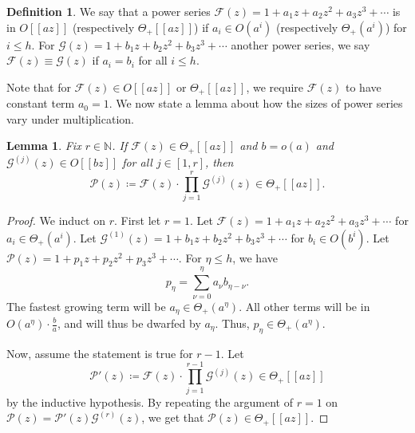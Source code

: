 \documentclass{daj}
\newtheorem{lemma}[theorem]{Lemma}
\theoremstyle{definition}
\newtheorem{definition}[theorem]{Definition}
\theoremstyle{remark}
\numberwithin{equation}{section}
\numberwithin{theorem}{section}
\newcommand{\N}{\mathbb{N}}
\newcommand{\calf}{\mathcal{F}}
\newcommand{\calg}{\mathcal{G}}
\newcommand{\calp}{\mathcal{P}}
\begin{document}
\begin{definition}
    We say that a power series $\calf(z) = 1 + a_1z+a_2z^{2} + a_3z^3 + \cdots$ is in $O[[az]]$ (respectively $\Theta_+[[az]]$) if $a_i \in O(a^i)$ (respectively $\Theta_+(a^i)$) for $i \leq h$. For $\calg(z)= 1 + b_1z+b_2z^{2} + b_3z^3 + \cdots$ another power series, we say $\calf(z) \equiv \calg(z)$ if $a_i = b_i$ for all $i \leq h$.
\end{definition}

Note that for $\calf(z) \in O[[az]]$ or $\Theta_+[[az]]$, we require $\calf(z)$ to have constant term $a_0 = 1$. We now state a lemma about how the sizes of power series vary under multiplication.

\begin{lemma}\label{lemmaProductsofGenFuncs}
    Fix $r \in \N$. If $\calf(z) \in \Theta_+[[az]]$ and $b = o(a)$ and $\calg^{(j)}(z) \in O[[bz]]$ for all $j \in [1,r]$, then \[\calp(z) \coloneq \calf(z)\cdot \prod_{j=1}^r\calg^{(j)}(z) \in \Theta_+[[az]].\]
\end{lemma}
\begin{proof}
    We induct on $r$. First let $r = 1$. Let $\calf(z) = 1 +a_1z+a_2z^{2} + a_3z^3 + \cdots$ for $a_i \in \Theta_+(a^i)$. Let $\calg^{(1)}(z) = 1 +b_1z+b_2z^{2} + b_3z^3 + \cdots$ for $b_i \in O(b^i)$. Let $\calp(z) = 1+p_1z+p_2z^2+p_3z^3 + \cdots $. For $\eta \leq h$, we have \[p_\eta = \sum_{\nu=0}^\eta a_\nu b_{\eta-\nu}.\] The fastest growing term will be $a_\eta \in \Theta_+(a^\eta)$. All other terms will be in $O(a^\eta) \cdot \frac{b}{a}$, and will thus be dwarfed by $a_\eta$. Thus, $p_{\eta} \in \Theta_+(a^\eta)$. 

    Now, assume the statement is true for $r -1$. Let \[\calp'(z) \coloneq \calf(z)\cdot \prod_{j=1}^{r-1}\calg^{(j)}(z) \in \Theta_+[[az]]\] by the inductive hypothesis. By repeating the argument of $r = 1$ on $\calp(z) = \calp'(z)\calg^{(r)}(z)$, we get that $\calp(z) \in \Theta_+[[az]]$.
\end{proof}
\end{document}
